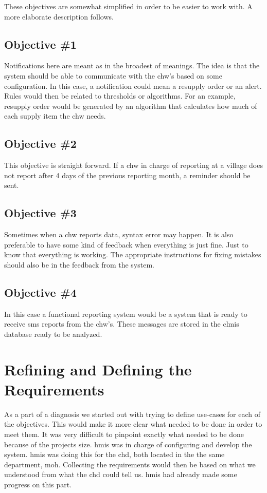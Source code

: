 These objectives are somewhat simplified in order to be easier to work with. A more elaborate description follows. 
\subsection{Objective \#1}
Notifications here are meant as in the broadest of meanings. The idea is that the system should be able to communicate with the \gls{chw}'s based on some configuration. In this case, a notification could mean a resupply order or an alert. Rules would then be related to thresholds or algorithms. For an example, resupply order would be generated by an algorithm that calculates how much of each supply item the \gls{chw} needs. 
\subsection{Objective \#2}
This objective is straight forward. If a \gls{chw} in charge of reporting at a village does not report after 4 days of the previous reporting month, a reminder should be sent. 
\subsection{Objective \#3}
Sometimes when a \gls{chw} reports data, syntax error may happen. It is also preferable to have some kind of feedback when everything is just fine. Just to know that everything is working. 
The appropriate instructions for fixing mistakes should also be in the feedback from the system.
\subsection{Objective \#4}
In this case a functional reporting system would be a system that is ready to receive \gls{sms} reports from the \gls{chw}'s. These messages are stored in the \gls{clmis} database ready to be analyzed. 

\section{Refining and Defining the Requirements}
As a part of a diagnosis we started out with trying to define use-cases for each of the objectives. 
This would make it more clear what needed to be done in order to meet them.
It was very difficult to pinpoint exactly what needed to be done because of the projects size. 
\gls{hmis} was in charge of configuring and develop the system. \gls{hmis} was doing this for the \gls{chd}, both located in the the same department, \gls{moh}. 
Collecting the requirements would then be based on what we understood from what the \gls{chd} could tell us. \gls{hmis} had already made some progress on this part.  

